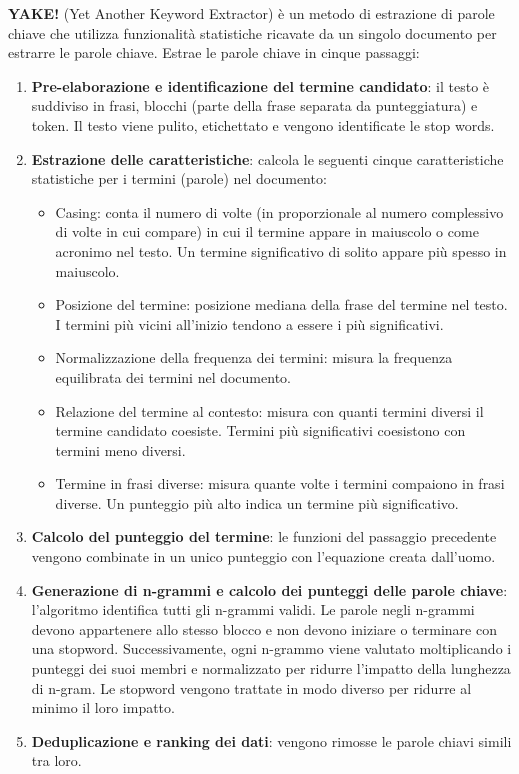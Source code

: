\textbf{YAKE!} (Yet Another Keyword Extractor) è un metodo di estrazione di parole chiave che utilizza funzionalità statistiche ricavate da un singolo documento per estrarre le parole chiave. Estrae le parole chiave in cinque passaggi:
\begin{enumerate}
\item \textbf{Pre-elaborazione e identificazione del termine candidato}: il testo è suddiviso in frasi, blocchi (parte della frase separata da punteggiatura) e token. Il testo viene pulito, etichettato e vengono identificate le stop words.
\item \textbf{Estrazione delle caratteristiche}: calcola le seguenti cinque caratteristiche statistiche per i termini (parole) nel documento:
\begin{itemize}
\item Casing: conta il numero di volte (in proporzionale al numero complessivo di volte in cui compare) in cui il termine appare in maiuscolo o come acronimo nel testo. Un termine significativo di solito appare più spesso in maiuscolo.
\item Posizione del termine: posizione mediana della frase del termine nel testo. I termini più vicini all'inizio tendono a essere i più significativi.
\item Normalizzazione della frequenza dei termini: misura la frequenza equilibrata dei termini nel documento.
\item Relazione del termine al contesto: misura con quanti termini diversi il termine candidato coesiste. Termini più significativi coesistono con termini meno diversi. 
\item Termine in frasi diverse: misura quante volte i termini compaiono in frasi diverse. Un punteggio più alto indica un termine più significativo.
\end{itemize}
\item \textbf{Calcolo del punteggio del termine}: le funzioni del passaggio precedente vengono combinate in un unico punteggio con l'equazione creata dall'uomo.
\item \textbf{Generazione di n-grammi e calcolo dei punteggi delle parole chiave}: l'algoritmo identifica tutti gli n-grammi validi. Le parole negli n-grammi devono appartenere allo stesso blocco e non devono iniziare o terminare con una stopword. Successivamente, ogni n-grammo viene valutato moltiplicando i punteggi dei suoi membri e normalizzato per ridurre l'impatto della lunghezza di n-gram. Le stopword vengono trattate in modo diverso per ridurre al minimo il loro impatto.
\item \textbf{Deduplicazione e ranking dei dati}: vengono rimosse le parole chiavi simili tra loro.
\end{enumerate}

